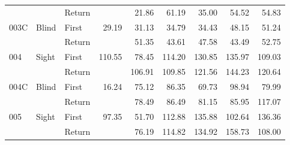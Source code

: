 \begin{table}[!htb]
\begin{tabular}{lllrrrrrr}
    &       & Return &          &   21.86 &   61.19 &                                                 35.00 &                                                  54.52 &   54.83 \\
003C & Blind & First &    29.19 &   31.13 &   34.79 &                                                 34.43 &                                                  48.15 &   51.24 \\
    &       & Return &          &   51.35 &   43.61 &                                                 47.58 &                                                  43.49 &   52.75 \\
004 & Sight & First &   110.55 &   78.45 &  114.20 &                                                130.85 &                                                 135.97 &  109.03 \\
    &       & Return &          &  106.91 &  109.85 &                                                121.56 &                                                 144.23 &  120.64 \\
004C & Blind & First &    16.24 &   75.12 &   86.35 &                                                 69.73 &                                                  98.94 &   79.99 \\
    &       & Return &          &   78.49 &   86.49 &                                                 81.15 &                                                  85.95 &  117.07 \\
005 & Sight & First &    97.35 &   51.70 &  112.88 &                                                135.88 &                                                 102.64 &  136.36 \\
    &       & Return &          &   76.19 &  114.82 &                                                134.92 &                                                 158.73 &  108.00 \\
\bottomrule
\end{tabular}
\end{table}

